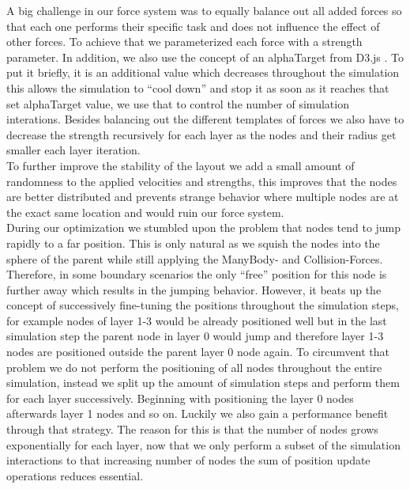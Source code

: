 A big challenge in our force system was to equally balance out all added forces so that each one performs their specific task and does not influence the effect of other forces. To achieve that we parameterized each force with a strength parameter.
In addition, we also use the concept of an alphaTarget from D3.js \cite{bostock_d3js_nodate}. To put it briefly, it is an additional value which decreases throughout the simulation this allows the simulation to “cool down” and stop it as soon as it reaches that set alphaTarget value, we use that to control the number of simulation interations. 
Besides balancing out the different templates of forces we also have to decrease the strength recursively for each layer as the nodes and their radius get smaller each layer iteration.\\
To further improve the stability of the layout we add a small amount of randomness to the applied velocities and strengths, this improves that the nodes are better distributed and prevents strange behavior where multiple nodes are at the exact same location and would ruin our force system.\\
During our optimization we stumbled upon the problem that nodes tend to jump rapidly to a far position. This is only natural as we squish the nodes into the sphere of the parent while still applying the ManyBody- and Collision-Forces. Therefore, in some boundary scenarios the only “free” position for this node is further away which results in the jumping behavior. However, it beats up the concept of successively fine-tuning the positions throughout the simulation steps, for example nodes of layer 1-3 would be already positioned well but in the last simulation step the parent node in layer 0 would jump and therefore layer 1-3 nodes are positioned outside the parent layer 0 node again. To circumvent that problem we do not perform the positioning of all nodes throughout the entire simulation, instead we split up the amount of simulation steps and perform them for each layer successively. Beginning with positioning the layer 0 nodes afterwards layer 1 nodes and so on. Luckily we also gain a performance benefit through that strategy. The reason for this is that the number of nodes grows exponentially for each layer, now that we only perform a subset of the simulation interactions to that increasing number of nodes the sum of position update operations reduces essential.
